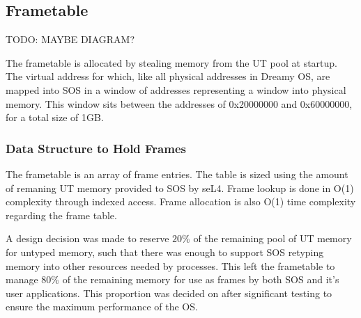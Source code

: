 \documentclass[runningheads,a4paper]{llncs}
\begin{document}

\medskip
\medskip

\subsection{Frametable}

TODO: MAYBE DIAGRAM?

The frametable is allocated by stealing memory from the UT pool at startup. The virtual address for which, like all physical addresses in Dreamy OS, are mapped into SOS in a window of addresses representing a window into physical memory. This window sits between the addresses of 0x20000000 and 0x60000000, for a total size of 1GB. 

\subsubsection{Data Structure to Hold Frames}
The frametable is an array of frame entries. The table is sized using the amount of remaning UT memory provided to SOS by seL4. Frame lookup is done in O(1) complexity through indexed access. Frame allocation is also O(1) time complexity regarding the frame table.

A design decision was made to reserve $20\%$ of the remaining pool of UT memory for untyped memory, such that there was enough to support SOS retyping memory into other resources needed by processes. This left the frametable to manage $80\%$ of the remaining memory for use as frames by both SOS and it's user applications. This proportion was decided on after significant testing to ensure the maximum performance of the OS.
\end{document}
